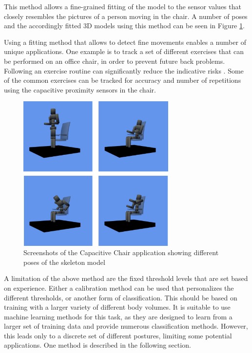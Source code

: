 This method allows a fine-grained fitting of the model to the sensor values that closely resembles the pictures of a person moving in the chair. A number of poses and the accordingly fitted 3D models using this method can be seen in Figure \ref{fig:smartchair_skeleton_poses}.

Using a fitting method that allows to detect fine movements enables a number of unique applications. One example is to track a set of different exercises that can be performed on an office chair, in order to prevent future back problems. Following an exercise routine can significantly reduce the indicative risks \cite{robertson2009effects}. Some of the common exercises can be tracked for accuracy and number of repetitions using the capacitive proximity sensors in the chair.

\begin{figure}[ht]
\centering
\includegraphics[width=0.7\textwidth]{images/smartchair_skeleton_poses}
\caption{Screenshots of the Capacitive Chair application showing different poses of the skeleton model}
\label{fig:smartchair_skeleton_poses}
\end{figure}

A limitation of the above method are the fixed threshold levels that are set based on experience. Either a calibration method can be used that personalizes the different thresholds, or another form of classification. This should be based on training with a larger variety of different body volumes. It is suitable to use machine learning methods for this task, as they are designed to learn from a larger set of training data and provide numerous classification methods. However, this leads only to a discrete set of different postures, limiting some potential applications. One method is described in the following section.


